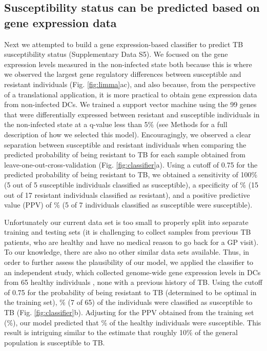 \documentclass[fleqn,10pt]{wlscirep}
\begin{document}
\subsection*{Susceptibility status can be predicted based on gene expression data}

Next we attempted to build a gene expression-based classifier to
predict TB susceptibility status (Supplementary Data S5). We focused
on the gene expression levels measured in the non-infected state both
because this is where we observed the largest gene regulatory
differences between susceptible and resistant individuals (Fig.
\ref{fig:limma}ac), and also because, from the perspective of a
translational application, it is more practical to obtain gene
expression data from non-infected DCs. We trained a support vector
machine using the 99 genes that were differentially expressed between
resistant and susceptible individuals in the non-infected state at a
q-value less than 5\% (see Methods for a full description of how we
selected this model). Encouragingly, we observed a clear separation
between susceptible and resistant individuals when comparing the
predicted probability of being resistant to TB for each sample
obtained from leave-one-out-cross-validation (Fig.
\ref{fig:classifier}a). Using a cutoff of 0.75 for the predicted
probability of being resistant to TB, we obtained a sensitivity of
100\% (5 out of 5 susceptible individuals classified as susceptible),
a specificity of \% (15 out of 17 resistant individuals
classified as resistant), and a positive predictive value (PPV) of
\% (5 of 7 individuals classified as susceptible were
susceptible).

Unfortunately our current data set is too small to properly split into
separate training and testing sets (it is challenging to collect
samples from previous TB patients, who are healthy and have no medical
reason to go back for a GP visit). To our knowledge, there are also no
other similar data sets available. Thus, in order to further assess
the plausibility of our model, we applied the classifier to an
independent study, which collected genome-wide gene expression levels
in DCs from 65 healthy individuals \cite{Barreiro2012}, none with a
previous history of TB. Using the cutoff of 0.75 for the probability
of being resistant to TB (determined to be optimal in the training
set), \% (7 of 65) of the individuals were classified
as susceptible to TB (Fig. \ref{fig:classifier}b). Adjusting for the
PPV obtained from the training set (\%), our model
predicted that \% of the healthy individuals were
susceptible. This result is intriguing similar to the estimate that
roughly 10\% of the general population is susceptible to TB.
\end{document}
